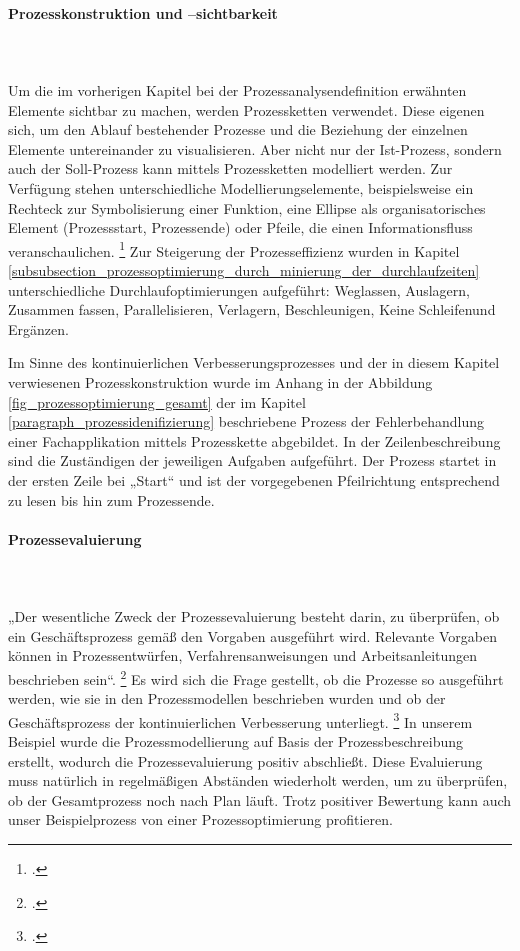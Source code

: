 \paragraph{Prozesskonstruktion und –sichtbarkeit}\mbox{}\\\\
\label{paragraph_prozesskonstruktion_und_sichtbarkeit}
Um die im vorherigen Kapitel bei der Prozessanalysendefinition erwähnten Elemente sichtbar zu machen, werden Prozessketten verwendet. Diese eigenen sich, um den Ablauf bestehender Prozesse und die Beziehung der einzelnen Elemente untereinander zu visualisieren. Aber nicht nur der Ist-Prozess, sondern auch der Soll-Prozess kann mittels Prozessketten modelliert werden. Zur Verfügung stehen unterschiedliche Modellierungselemente, beispielsweise ein Rechteck zur Symbolisierung einer Funktion, eine Ellipse als organisatorisches Element (Prozessstart, Prozessende) oder Pfeile, die einen Informationsfluss veranschaulichen. \footcite[Vgl.][64]{krcmar_einfuhrung_2015} Zur Steigerung der Prozesseffizienz wurden in Kapitel \ref{subsubsection_prozessoptimierung_durch_minierung_der_durchlaufzeiten} unterschiedliche Durchlaufoptimierungen aufgeführt: \glqq Weglassen\grqq, \glqq Auslagern\grqq, \glqq Zusammen fassen\grqq, \glqq Parallelisieren\grqq, \glqq Verlagern\grqq, \glqq Beschleunigen\grqq, \glqq Keine Schleifen\grqq und \glqq Ergänzen\grqq.

Im Sinne des kontinuierlichen Verbesserungsprozesses und der in diesem Kapitel verwiesenen Prozesskonstruktion wurde im Anhang in der Abbildung \ref{fig_prozessoptimierung_gesamt} der im Kapitel \ref{paragraph_prozessidenifizierung} beschriebene Prozess der Fehlerbehandlung einer Fachapplikation mittels Prozesskette abgebildet. In der Zeilenbeschreibung sind die Zuständigen der jeweiligen Aufgaben aufgeführt. Der Prozess startet in der ersten Zeile bei „Start“ und ist der vorgegebenen Pfeilrichtung entsprechend zu lesen bis hin zum Prozessende. 

\paragraph{Prozessevaluierung}\mbox{}\\\\
„Der wesentliche Zweck der Prozessevaluierung besteht darin, zu überprüfen, ob ein Geschäftsprozess gemäß den Vorgaben ausgeführt wird. Relevante Vorgaben können in Prozessentwürfen, Verfahrensanweisungen und Arbeitsanleitungen beschrieben sein“. \footcite[277]{heinrich_stelzer_2011} Es wird sich die Frage gestellt, ob die Prozesse so ausgeführt werden, wie sie in den Prozessmodellen beschrieben wurden und ob der Geschäftsprozess der kontinuierlichen Verbesserung unterliegt. \footcite[Vgl.][277]{heinrich_stelzer_2011} In unserem Beispiel wurde die Prozessmodellierung auf Basis der Prozessbeschreibung erstellt, wodurch die Prozessevaluierung positiv abschließt. Diese Evaluierung muss natürlich in regelmäßigen Abständen wiederholt werden, um zu überprüfen, ob der Gesamtprozess noch nach Plan läuft. Trotz positiver Bewertung kann auch unser Beispielprozess von einer Prozessoptimierung profitieren.

